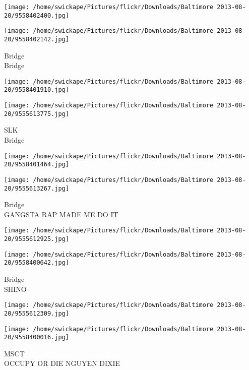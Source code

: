 \documentclass[10pt,letterpaper]{article}
\begin{document}
\texttt{[image: /home/swickape/Pictures/flickr/Downloads/Baltimore 2013-08-20/9558402400.jpg]}

\vspace{0.25in}
\texttt{[image: /home/swickape/Pictures/flickr/Downloads/Baltimore 2013-08-20/9558402142.jpg]}

Bridge\\
Bridge\\
\pagebreak

\texttt{[image: /home/swickape/Pictures/flickr/Downloads/Baltimore 2013-08-20/9558401910.jpg]}

\vspace{0.25in}
\texttt{[image: /home/swickape/Pictures/flickr/Downloads/Baltimore 2013-08-20/9555613775.jpg]}

SLK\\
Bridge\\
\pagebreak

\texttt{[image: /home/swickape/Pictures/flickr/Downloads/Baltimore 2013-08-20/9558401464.jpg]}

\vspace{0.25in}
\texttt{[image: /home/swickape/Pictures/flickr/Downloads/Baltimore 2013-08-20/9555613267.jpg]}

Bridge\\
GANGSTA RAP MADE ME DO IT\\
\pagebreak

\texttt{[image: /home/swickape/Pictures/flickr/Downloads/Baltimore 2013-08-20/9555612925.jpg]}

\vspace{0.25in}
\texttt{[image: /home/swickape/Pictures/flickr/Downloads/Baltimore 2013-08-20/9558400642.jpg]}

Bridge\\
SHINO\\
\pagebreak

\texttt{[image: /home/swickape/Pictures/flickr/Downloads/Baltimore 2013-08-20/9555612309.jpg]}

\vspace{0.25in}
\texttt{[image: /home/swickape/Pictures/flickr/Downloads/Baltimore 2013-08-20/9558400016.jpg]}

MSCT\\
OCCUPY OR DIE NGUYEN DIXIE\\
\pagebreak
\end{document}

